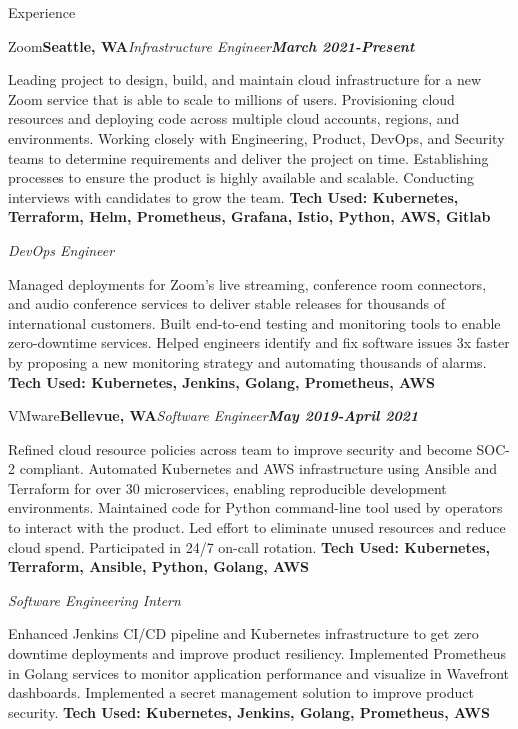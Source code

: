 \documentclass{resume}
\begin{document}

\begin{rSection}{Experience}

\begin{rSubsection}{Zoom}{\bf Seattle, WA}{\em \it Infrastructure Engineer}{\em \bf March 2021-Present}
\item 
Leading project to design, build, and maintain cloud infrastructure for a new Zoom service that is able to scale to millions of users. Provisioning cloud resources and deploying code across multiple cloud accounts, regions, and environments. Working closely with Engineering, Product, DevOps, and Security teams to determine requirements and deliver the project on time. Establishing processes to ensure the product is highly available and scalable. Conducting interviews with candidates to grow the team.
{\bf Tech Used: Kubernetes, Terraform, Helm, Prometheus, Grafana, Istio, Python, AWS, Gitlab}

{}{\bf}{\em \it DevOps Engineer}{\em \bf}
\item Managed deployments for Zoom's live streaming, conference room connectors, and audio conference services to deliver stable releases for thousands of international customers. Built end-to-end testing and monitoring tools to enable zero-downtime services. Helped engineers identify and fix software issues 3x faster by proposing a new monitoring strategy and automating thousands of alarms.
{\bf Tech Used: Kubernetes, Jenkins, Golang, Prometheus, AWS}
\end{rSubsection}

\begin{rSubsection}{VMware}{\bf Bellevue, WA}{\em \it Software Engineer}{\em \bf May 2019-April 2021}
\item 
Refined cloud resource policies across team to improve security and become SOC-2 compliant. Automated Kubernetes and AWS infrastructure using Ansible and Terraform for over 30 microservices, enabling reproducible development environments. Maintained code for Python command-line tool used by operators to interact with the product. Led effort to eliminate unused resources and reduce cloud spend. Participated in 24/7 on-call rotation. {\bf Tech Used: Kubernetes, Terraform, Ansible, Python, Golang, AWS}

{}{\bf}{\em \it Software Engineering Intern}{\em \bf}
\item Enhanced Jenkins CI/CD pipeline and Kubernetes infrastructure to get zero downtime deployments and improve product resiliency. Implemented Prometheus in Golang services to monitor application performance and visualize in Wavefront dashboards. Implemented a secret management solution to improve product security.
{\bf Tech Used: Kubernetes, Jenkins, Golang, Prometheus, AWS}
\end{rSubsection}


\end{rSection}
\end{document}
